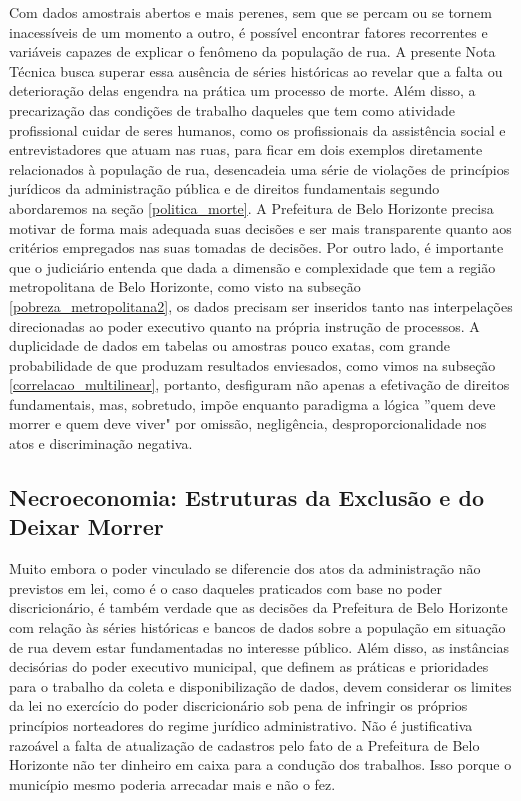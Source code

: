 \documentclass[12pt]{article}
\begin{document}
Com dados amostrais abertos e mais perenes, sem que se percam ou se tornem inacessíveis de um momento a outro, é possível encontrar fatores recorrentes e variáveis capazes de explicar o fenômeno da população de rua. A presente Nota Técnica busca superar essa ausência de séries históricas ao revelar que a falta ou deterioração delas engendra na prática um processo de morte. Além disso, a precarização das condições de trabalho daqueles que tem como atividade profissional cuidar de seres humanos, como os profissionais da assistência social e entrevistadores que atuam nas ruas, para ficar em dois exemplos diretamente relacionados à população de rua, desencadeia uma série de violações de princípios jurídicos da administração pública e de direitos fundamentais segundo abordaremos na seção \ref{politica_morte}. A Prefeitura de Belo Horizonte precisa motivar de forma mais adequada suas decisões e ser mais transparente quanto aos critérios empregados nas suas tomadas de decisões. Por outro lado, é importante que o judiciário entenda que dada a dimensão e complexidade que tem a região metropolitana de Belo Horizonte, como visto na subseção \ref{pobreza_metropolitana2}, os dados precisam ser inseridos tanto nas interpelações direcionadas ao poder executivo quanto na própria instrução de processos. A duplicidade de dados em tabelas ou amostras pouco exatas, com grande probabilidade de que produzam resultados enviesados, como vimos na subseção \ref{correlacao_multilinear}, portanto, desfiguram não apenas a efetivação de direitos fundamentais, mas, sobretudo, impõe enquanto paradigma a lógica ''quem deve morrer e quem deve viver" por omissão, negligência, desproporcionalidade nos atos e discriminação negativa.\\    

\subsection{Necroeconomia: Estruturas da Exclusão e do Deixar Morrer}
\label{necroeconomia}

Muito embora o poder vinculado se diferencie dos atos da administração não previstos em lei, como é o caso daqueles praticados com base no poder discricionário, é também verdade que as decisões da Prefeitura de Belo Horizonte com relação às séries históricas e bancos de dados sobre a população em situação de rua devem estar fundamentadas no interesse público. Além disso, as instâncias decisórias do poder executivo municipal, que definem as práticas e prioridades para o trabalho da coleta e disponibilização de dados, devem considerar os limites da lei no exercício do poder discricionário sob pena de infringir os próprios princípios norteadores do regime jurídico administrativo. Não é justificativa razoável a falta de atualização de cadastros pelo fato de a Prefeitura de Belo Horizonte não ter dinheiro em caixa para a condução dos trabalhos. Isso porque o município mesmo poderia arrecadar mais e não o fez.\\
\end{document}
